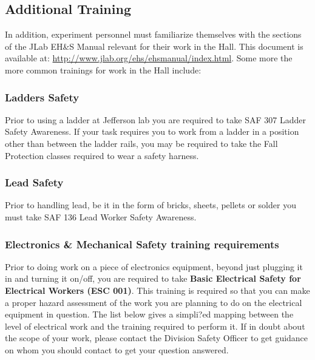 \documentclass[10pt]{article}
\begin{document}
\subsection{Additional Training}

In addition, experiment personnel must familiarize themselves with the 
sections of the JLab EH\&S Manual relevant for their work in the Hall. 
This document is available  at:  \url{http://www.jlab.org/ehs/ehsmanual/index.html}.
Some more the more common trainings for work in the Hall include: 

\subsubsection{Ladders Safety}

Prior to using a ladder at Jefferson lab you are required to 
take SAF 307 Ladder Safety Awareness.  If your task requires you to work from a 
ladder in a position other than between the ladder rails, you may be required 
to take the Fall Protection classes required to wear a safety harness. 

\subsubsection{Lead Safety}

Prior to handling lead, be it in the form of bricks, sheets, pellets or solder you must take SAF 136 Lead Worker Safety Awareness.

\subsubsection{Electronics \& Mechanical Safety training requirements}

Prior to doing work on a piece of electronics equipment, beyond just plugging it in and turning it on/off,
you are required to take {\bf Basic Electrical Safety for Electrical Workers (ESC 001)}. This training
is required so that you can make a proper hazard assessment of the work you are planning to do on the
electrical equipment in question.
The list below gives a simpli?ed mapping between the level of electrical work and the training required
to perform it. If in doubt about the scope of your work, please contact the Division Safety Officer to get
guidance on whom you should contact to get your question answered.
\end{document}
